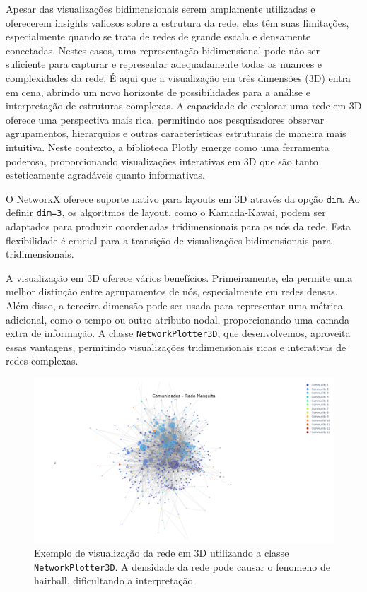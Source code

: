 Apesar das visualizações bidimensionais serem amplamente utilizadas e oferecerem insights valiosos sobre a estrutura da rede, elas têm suas limitações, especialmente quando se trata de redes de grande escala e densamente conectadas. Nestes casos, uma representação bidimensional pode não ser suficiente para capturar e representar adequadamente todas as nuances e complexidades da rede. É aqui que a visualização em três dimensões (3D) entra em cena, abrindo um novo horizonte de possibilidades para a análise e interpretação de estruturas complexas. A capacidade de explorar uma rede em 3D oferece uma perspectiva mais rica, permitindo aos pesquisadores observar agrupamentos, hierarquias e outras características estruturais de maneira mais intuitiva. Neste contexto, a biblioteca Plotly emerge como uma ferramenta poderosa, proporcionando visualizações interativas em 3D que são tanto esteticamente agradáveis quanto informativas.

O NetworkX oferece suporte nativo para layouts em 3D através da opção \texttt{dim}. Ao definir \texttt{dim=3}, os algoritmos de layout, como o Kamada-Kawai, podem ser adaptados para produzir coordenadas tridimensionais para os nós da rede. Esta flexibilidade é crucial para a transição de visualizações bidimensionais para tridimensionais.

A visualização em 3D oferece vários benefícios. Primeiramente, ela permite uma melhor distinção entre agrupamentos de nós, especialmente em redes densas. Além disso, a terceira dimensão pode ser usada para representar uma métrica adicional, como o tempo ou outro atributo nodal, proporcionando uma camada extra de informação. A classe \texttt{NetworkPlotter3D}, que desenvolvemos, aproveita essas vantagens, permitindo visualizações tridimensionais ricas e interativas de redes complexas.

\begin{figure}[h]
\centering
\includegraphics[scale=0.3]{images/3d_plot_example.png}
\caption{Exemplo de visualização da rede em 3D utilizando a classe \texttt{NetworkPlotter3D}. A densidade da rede pode causar o fenomeno de hairball, dificultando a interpretação.}
\label{fig:3d_plot_example}
\fautor
\end{figure}

